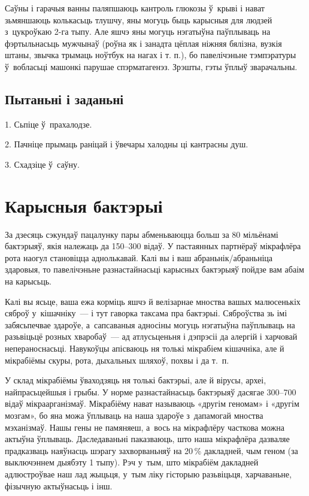 Саўны і гарачыя ванны паляпшаюць кантроль глюкозы ў~крыві і нават зьмяншаюць колькасьць тлушчу, яны могуць быць карысныя для людзей з~цукроўкаю 2-га тыпу. Але яшчэ яны могуць нэгатыўна паўплываць на фэртыльнасьць мужчынаў (роўна як і занадта цёплая ніжняя бялізна, вузкія штаны, звычка трымаць ноўтбук на нагах і т. п.), бо павелічэньне тэмпэратуры ў~вобласьці машонкі парушае спэрматагенэз. Зрэшты, гэты ўплыў зварачальны.

\subsection*{Пытаньні і заданьні}

1. Сьпіце ў~прахалодзе.

2. Пачніце прымаць раніцай і ўвечары халодны ці кантрасны душ.

3. Схадзіце ў~саўну.


\section{Карысныя бактэрыі}

За дзесяць сэкундаў пацалунку пары абменьваюцца больш за 80 мільёнамі бактэрыяў, якія належаць да 150--300 відаў. У пастаянных партнёраў мікрафлёра рота наогул становіцца аднолькавай. Калі вы і ваш абраньнік/абраньніца здаровыя, то павелічэньне разнастайнасьці карысных бактэрыяў пойдзе вам абаім на карысьць.

Калі вы ясьце, ваша ежа корміць яшчэ й велізарнае мноства вашых малюсенькіх сяброў у~кішачніку~--- і тут гаворка таксама пра бактэрыі. Сяброўства зь імі забясьпечвае здароўе, а~сапсаваныя адносіны могуць нэгатыўна паўплываць на разьвіцьцё розных хваробаў~--- ад атлусьценьня і дэпрэсіі да алергій і харчовай непераноснасьці. Навукоўцы апісваюць ня толькі мікрабіем кішачніка, але й мікрабіёмы скуры, рота, дыхальных шляхоў, похвы і да т.~п.

У склад мікрабіёмы ўваходзяць ня толькі бактэрыі, але й вірусы, археі, найпрасьцейшыя і грыбы. У норме разнастайнасьць бактэрыяў дасягае 300--700 відаў мікраарганізмаў. Мікрабіёму нават называюць «другім геномам» і «другім мозгам», бо яна можа ўплываць на наша здароўе з~дапамогай мноства мэханізмаў. Нашы гены не памяняеш, а~вось на мікрафлёру часткова можна актыўна ўплываць. Даследаваньні паказваюць, што наша мікрафлёра дазваляе прадказваць наяўнасць шэрагу захворваньняў на 20\,\% дакладней, чым геном (за выключэннем дыябэту 1 тыпу). Рэч у~тым, што мікрабіём дакладней адлюстроўвае наш лад жыцьця, у~тым ліку гісторыю разьвіцьця, харчаваньне, фізычную актыўнасьць і інш.

